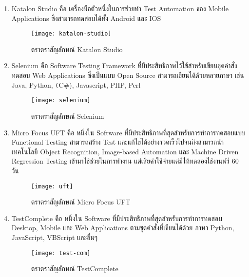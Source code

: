         \begin{enumerate}

            \item Katalon Studio คือ เครื่องมือตัวหนึ่งในการช่วยทำ Test Automation ของ Mobile Applications ซึ่งสามารถทดสอบได้ทั้ง
            Android และ IOS
            \begin{figure}[H]
                \centering
                \texttt{[image: katalon-studio]}
                \caption{ตราตราสัญลักษณ์ Katalon Studio}\label{katalon-studio}
            \end{figure}

            \item Selenium คือ Software Testing Framework ที่มีประสิทธิภาพไว้ใช้สำหรับเขียนชุดคำสั่งทดสอบ Web Applications ซึ่งเป็นแบบ Open Source สามารถเขียนได้ด้วยหลายภาษา เช่น Java, Python, \texttt(C\#), Javascript, PHP, Perl 
            \begin{figure}[H]
                \centering
                \texttt{[image: selenium]}
                \caption{ตราตราสัญลักษณ์ Selenium}\label{selenium}
            \end{figure}

            \item Micro Focus UFT คือ หนึ่งใน Software ที่มีประสิทธิภาพที่สุดสำหรับการทำการทดสอบแบบ Functional Testing สามารถสร้าง Test และแก้ไขได้อย่างรวดเร็วไปจนถึงสามารถนำเทคโนโลยี Object Recognition, Image-based Automation และ Machine Driven Regression Testing เข้ามาใช้ช่วยในการทำงาน
            แต่เสียค่าใช้จ่ายแต่มีให้ทดลองใช้งานฟรี 60 วัน
            \begin{figure}[H]
                \centering
                \texttt{[image: uft]}
                \caption{ตราตราสัญลักษณ์ Micro Focus UFT}\label{uft}
            \end{figure}

            \item TestComplete คือ หนึ่งใน Software ที่มีประสิทธิภาพที่สุดสำหรับการทำการทดสอบ Desktop, Mobile และ Web Applications ตามชุดคำสั่งที่เขียนได้ด้วย
            ภาษา Python, JavaScript, VBScript และอื่นๆ
            \begin{figure}[H]
                \centering
                \texttt{[image: test-com]}
                \caption{ตราตราสัญลักษณ์ TestComplete}\label{test-com}
            \end{figure}


        \end{enumerate}

